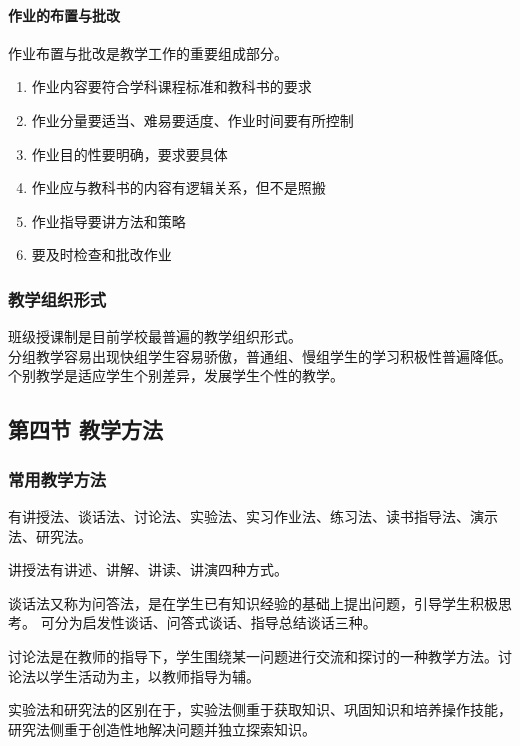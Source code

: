 \documentclass[b5paper,11pt]{article}
\begin{document}
\paragraph{作业的布置与批改} 作业布置与批改是教学工作的重要组成部分。

\begin{enumerate}
  \item 作业内容要符合学科课程标准和教科书的要求
  \item 作业分量要适当、难易要适度、作业时间要有所控制
  \item 作业目的性要明确，要求要具体
  \item 作业应与教科书的内容有逻辑关系，但不是照搬
  \item 作业指导要讲方法和策略
  \item 要及时检查和批改作业
\end{enumerate}

\subsubsection{教学组织形式}
\noindent
\textcolor{ctp-red}{班级授课制是目前学校最普遍的教学组织形式。} \\
\textcolor{ctp-red}{分组教学容易出现快组学生容易骄傲，普通组、慢组学生的学习积极性普遍降低。} \\
个别教学是适应学生个别差异，发展学生个性的教学。

\subsection{第四节 \space 教学方法}
\subsubsection{常用教学方法}
有\textcolor{ctp-red}{讲授法、谈话法、讨论法、实验法、实习作业法}、练习法、读书指导法、演示法、\textcolor{ctp-red}{研究法}。

\textcolor{ctp-red}{讲授法有讲述、讲解、讲读、讲演}四种方式。

谈话法又称为\textcolor{ctp-red}{问答法}，是在学生已有知识经验的基础上提出问题，引导学生积极思考。
可分为\textcolor{ctp-red}{启发性谈话、问答式谈话、指导总结谈话}三种。

讨论法是在教师的指导下，学生围绕某一问题进行交流和探讨的一种教学方法。讨论法\textcolor{ctp-red}{以学生活动为主，以教师指导为辅。}

实验法和研究法的区别在于，\textcolor{ctp-red}{实验法侧重于获取知识、巩固知识和培养操作技能，研究法侧重于创造性地解决问题并独立探索知识。}
\end{document}
